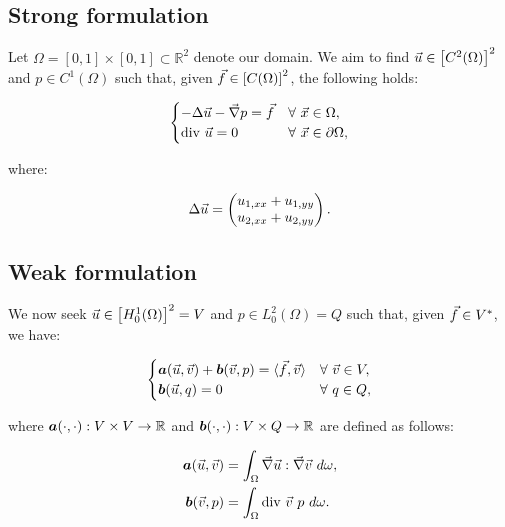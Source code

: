 \subsection{Strong formulation}

Let $\Omega = [0, 1] \times [0, 1] \subset \mathbb{R}^2$ denote our domain. We aim to find $\vec{u} \in \left[ C^2(\Omega) \right]^2$ and $p \in C^1(\Omega)$ such that, given $\vec{f} \in \left[ C(\Omega) \right]^2$, the following holds:

\begin{gather}
    \begin{cases} \label{strong_stokes}
        - \Delta \vec{u} - \vec{\nabla} p = \vec{f} & \forall ~ \vec{x} \in \Omega, \\
        \text{div } \vec{u} = 0 & \forall ~ \vec{x} \in \partial \Omega,
    \end{cases}
\end{gather}

where:

\begin{gather}
    \Delta \vec{u} = \begin{pmatrix}
        u_{1, xx} + u_{1, yy} \\
        u_{2, xx} + u_{2, yy}
    \end{pmatrix} .
\end{gather}

\subsection{Weak formulation}

We now seek $\vec{u} \in \left[ H^1_0(\Omega) \right]^2 = V$ and $p \in L^2_0(\Omega) = Q$ such that, given $\vec{f} \in V^*$, we have:

\begin{gather} \label{weak_stokes}
    \begin{cases}
        \bm{a}(\vec{u}, \vec{v}) + \bm{b}(\vec{v}, p) = \langle \vec{f}, \vec{v} \rangle & \forall ~ \vec{v} \in V,\\
        \bm{b}(\vec{u}, q) = 0 & \forall ~ q \in Q,
    \end{cases}
\end{gather}

where $\bm{a}(\cdot, \cdot): V \times V \rightarrow \mathbb{R}$ and $\bm{b}(\cdot, \cdot): V \times Q \rightarrow \mathbb{R}$ are defined as follows:

\begin{align}
    \bm{a}(\vec{u}, \vec{v}) &= \int_{\Omega} \vec{\nabla} \vec{u} : \vec{\nabla} \vec{v} ~ d \omega, \label{a} \\
    \bm{b}(\vec{v}, p) &= \int_{\Omega} \text{div } \vec{v} ~ p ~ d \omega. \label{b}
\end{align}

